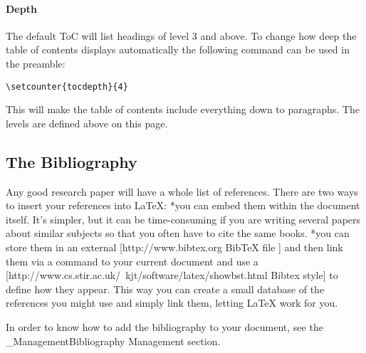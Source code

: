 \paragraph{ Depth }
The default ToC will list headings of level 3 and above.  To change how deep
the table of contents displays automatically the following command can be used
in the preamble:
\begin{lstlisting}
\setcounter{tocdepth}{4}
\end{lstlisting}

This will make the table of contents include everything down to paragraphs.
The levels are defined above on this page.

\subsection{ The Bibliography }
Any good research paper will have a whole list of references. There are two
ways to insert your references into LaTeX: *you can embed them within the
document itself. It's simpler, but it can be time-consuming if you are writing
several papers about similar subjects so that you often have to cite the same
books.  *you can store them in an external [http://www.bibtex.org BibTeX file ]
and then link them via a command to your current document and use a
[http://www.cs.stir.ac.uk/~kjt/software/latex/showbst.html Bibtex style] to
define how they appear. This way you can create a small database of the
references you might use and simply link them, letting LaTeX work for you.

In order to know how to add the bibliography to your document, see the
\_ManagementBibliography Management section.
